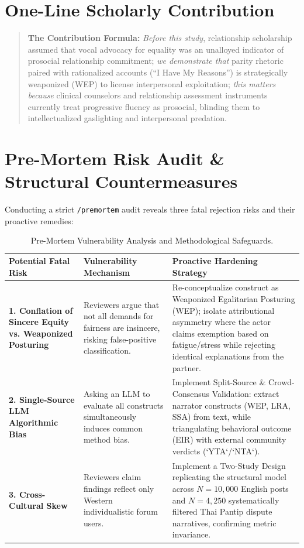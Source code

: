 \documentclass[11pt,a4paper]{article}
\begin{document}
\section{One-Line Scholarly Contribution}
\begin{quote}
\textbf{The Contribution Formula:} \textit{Before this study}, relationship scholarship assumed that vocal advocacy for equality was an unalloyed indicator of prosocial relationship commitment; \textit{we demonstrate that} parity rhetoric paired with rationalized accounts (``I Have My Reasons'') is strategically weaponized (WEP) to license interpersonal exploitation; \textit{this matters because} clinical counselors and relationship assessment instruments currently treat progressive fluency as prosocial, blinding them to intellectualized gaslighting and interpersonal predation.
\end{quote}

\section{Pre-Mortem Risk Audit \& Structural Countermeasures}
Conducting a strict \texttt{/premortem} audit reveals three fatal rejection risks and their proactive remedies:
\begin{table}[htbp]
\centering
\small
\begin{tabular}{p{3.5cm}p{5.5cm}p{5.5cm}}
\toprule
\textbf{Potential Fatal Risk} & \textbf{Vulnerability Mechanism} & \textbf{Proactive Hardening Strategy} \\
\midrule
\textbf{1. Conflation of Sincere Equity vs. Weaponized Posturing} & Reviewers argue that not all demands for fairness are insincere, risking false-positive classification. & Re-conceptualize construct as Weaponized Egalitarian Posturing (WEP); isolate attributional asymmetry where the actor claims exemption based on fatigue/stress while rejecting identical explanations from the partner. \\
\addlinespace
\textbf{2. Single-Source LLM Algorithmic Bias} & Asking an LLM to evaluate all constructs simultaneously induces common method bias. & Implement Split-Source \& Crowd-Consensus Validation: extract narrator constructs (WEP, LRA, SSA) from text, while triangulating behavioral outcome (EIR) with external community verdicts (`YTA`/`NTA`). \\
\addlinespace
\textbf{3. Cross-Cultural Skew} & Reviewers claim findings reflect only Western individualistic forum users. & Implement a Two-Study Design replicating the structural model across $N = 10,000$ English posts and $N = 4,250$ systematically filtered Thai Pantip dispute narratives, confirming metric invariance. \\
\bottomrule
\end{tabular}
\caption{Pre-Mortem Vulnerability Analysis and Methodological Safeguards.}
\end{table}



\end{document}
